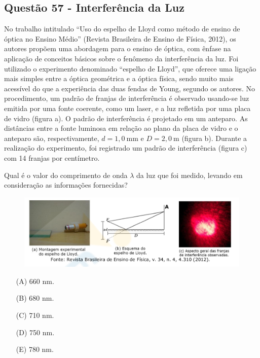 \documentclass[a4paper,12pt]{article}
\begin{document}
\begin{flushleft}
\subsection{Quest\~ao 57 - Interferência da Luz} 

No trabalho intitulado “Uso do espelho de Lloyd como método de ensino de óptica no Ensino Médio” 
(Revista Brasileira de Ensino de Física, 2012), os autores propõem uma abordagem para o ensino de óptica, 
com ênfase na aplicação de conceitos básicos sobre o fenômeno da interferência da luz. Foi utilizado o experimento denominado 
“espelho de Lloyd”, que oferece uma ligação mais simples entre a óptica geométrica e a óptica física, sendo muito mais acessível 
do que a experiência das duas fendas de Young, segundo os autores. No procedimento, um padrão de franjas de interferência é observado usando-se 
luz emitida por uma fonte coerente, como um laser, e a luz refletida por uma placa de vidro (figura a). O padrão de interferência é projetado em 
um anteparo. As distâncias entre a fonte luminosa em relação ao plano da placa de vidro e o anteparo são, respectivamente, \(d = 1,0\ \mathrm{mm}\) 
e \(D = 2,0\ \mathrm{m}\) (figura b). Durante a realização do experimento, foi registrado um padrão de interferência (figura c) com 14 franjas por centímetro. 

Qual é o valor do comprimento de onda \(\lambda\) da luz que foi medido, levando em consideração as informações fornecidas?

\begin{figure}[!h]
  \centering
  \includegraphics[scale=0.6]{figures/espelho_LIoyd.png}
\end{figure}

\begin{itemize}
\item[(A)] 660 nm.
\item[(B)] 680 nm.
\item[(C)] 710 nm.
\item[(D)] 750 nm.
\item[(E)] 780 nm.
\end{itemize}


\end{flushleft}
\end{document}
